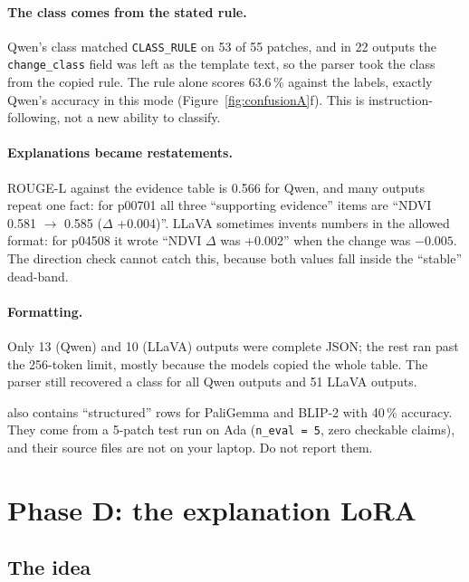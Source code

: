 \paragraph{The class comes from the stated rule.} Qwen's class matched \texttt{CLASS\_RULE} on 53 of 55 patches, and in 22 outputs the \texttt{change\_class} field was left as the template text, so the parser took the class from the copied rule. The rule alone scores 63.6\,\% against the labels, exactly Qwen's accuracy in this mode (Figure~\ref{fig:confusionA}f). This is instruction-following, not a new ability to classify.

\paragraph{Explanations became restatements.} ROUGE-L against the evidence table is 0.566 for Qwen, and many outputs repeat one fact: for p00701 all three ``supporting evidence'' items are ``NDVI 0.581 $\rightarrow$ 0.585 ($\Delta$ +0.004)''. LLaVA sometimes invents numbers in the allowed format: for p04508 it wrote ``NDVI $\Delta$ was +0.002'' when the change was $-0.005$. The direction check cannot catch this, because both values fall inside the ``stable'' dead-band.

\paragraph{Formatting.} Only 13 (Qwen) and 10 (LLaVA) outputs were complete JSON; the rest ran past the 256-token limit, mostly because the models copied the whole table. The parser still recovered a class for all Qwen outputs and 51 LLaVA outputs.

\begin{watchout}
 also contains ``structured'' rows for PaliGemma and BLIP-2 with 40\,\% accuracy. They come from a 5-patch test run on Ada (\texttt{n\_eval = 5}, zero checkable claims), and their source files are not on your laptop. Do not report them.
\end{watchout}

\section{Phase D: the explanation LoRA}
\label{sec:explora}

\subsection{The idea}

